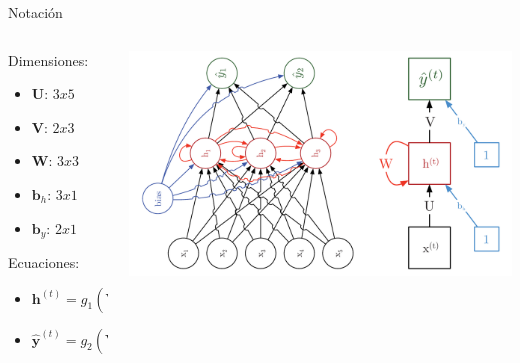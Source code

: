 \documentclass[aspectratio=169]{beamer}
\begin{document}
\begin{frame}{Notación}

	\begin{columns}
		\begin{column}{0.4\textwidth}
			Dimensiones:
			\begin{itemize}
			  \item $\mathbf{U}$: $3x5$
			  \item $\mathbf{V}$: $2x3$
			  \item $\mathbf{W}$: $3x3$
			  \item $\mathbf{b}_{h}$: $3x1$
			  \item $\mathbf{b}_{y}$: $2x1$
			\end{itemize}
			\vspace{1em}
			Ecuaciones:
			\begin{itemize}
			  \item $\mathbf{h}^{(t)} = g_{1}(\mathbf{Wh}^{(t-1)}+\mathbf{Ux}^{(t)}+\mathbf{b}_{h})$
			  \item $\mathbf{\hat{y}}^{(t)} = g_{2}(\mathbf{Vh}^{(t)}+\mathbf{b}_{y})$
			\end{itemize}
		\end{column}

		\begin{column}{0.6\textwidth}
			\begin{center}
				\includegraphics[width=\textwidth]{imgs/tema4/rnn/ECU.pdf}
			\end{center}
		\end{column}
	\end{columns}

\end{frame}
\end{document}
